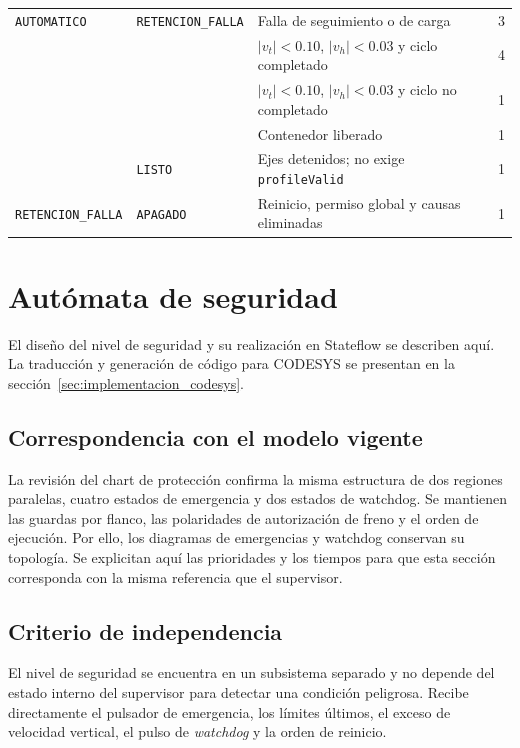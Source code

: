 \documentclass[a4paper,10pt,onecolumn,journal]{ieeeconf}
\numberwithin{equation}{section}
\begin{document}
{\begin{longtable}{L{3.5cm} L{3.5cm} L{6.4cm} C{1.0cm}}
\texttt{AUTOMATICO} & \texttt{RETENCION\_FALLA} & Falla de seguimiento o de carga & 3\\
 &  & $|v_t|<0.10$, $|v_h|<0.03$ y ciclo completado & 4\\
 &  & $|v_t|<0.10$, $|v_h|<0.03$ y ciclo no completado & 1\\
 &  & Contenedor liberado & 1\\
 & \texttt{LISTO} & Ejes detenidos; no exige \texttt{profileValid} & 1\\
\texttt{RETENCION\_FALLA} & \texttt{APAGADO} & Reinicio, permiso global y causas eliminadas & 1\\
\bottomrule
\end{longtable}
}


\par
{}
\section{Autómata de seguridad}
\label{sec:seguridad_MIL}
El diseño del nivel de seguridad y su realización en Stateflow se describen aquí. La traducción y generación de código para CODESYS se presentan en la sección~\ref{sec:implementacion_codesys}.


\subsection{Correspondencia con el modelo vigente}
La revisión del chart de protección confirma la misma estructura de dos regiones paralelas, cuatro estados de emergencia y dos estados de watchdog. Se mantienen las guardas por flanco, las polaridades de autorización de freno y el orden de ejecución. Por ello, los diagramas de emergencias y watchdog conservan su topología. Se explicitan aquí las prioridades y los tiempos para que esta sección corresponda con la misma referencia que el supervisor.


\subsection{Criterio de independencia}
El nivel de seguridad se encuentra en un subsistema separado y no depende del estado interno del supervisor para detectar una condición peligrosa. Recibe directamente el pulsador de emergencia, los límites últimos, el exceso de velocidad vertical, el pulso de \textit{watchdog} y la orden de reinicio.
\end{document}
